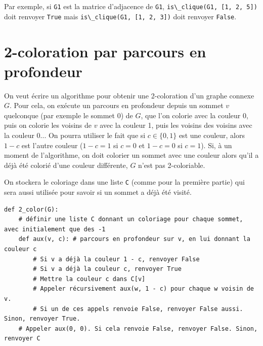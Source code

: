 
Par exemple, si \lstinline{G1} est la matrice d’adjacence de \lstinline{G1}, \lstinline{is\_clique(G1, [1, 2, 5])} doit renvoyer \lstinline{True} mais \lstinline{is\_clique(G1, [1, 2, 3])} doit renvoyer \lstinline{False}.

\section*{2-coloration par parcours en profondeur}
On veut écrire un algorithme pour obtenir une 2-coloration d’un graphe connexe $G$. Pour cela, on exécute un parcours en
profondeur depuis un sommet $v$ quelconque (par exemple le sommet 0) de $G$, que l’on colorie avec la couleur 0, puis on colorie
les voisins de $v$ avec la couleur 1, puis les voisins des voisins avec la couleur 0...
On pourra utiliser le fait que si $c\in\{0, 1\}$ est une couleur, alors $1- c$ est l’autre couleur ($1 -c = 1$ si $c = 0$ et $1 - c = 0$ si $c = 1$).
Si, à un moment de l’algorithme, on doit colorier un sommet avec une couleur alors qu’il a déjà été colorié d’une couleur différente,
$G$ n’est pas 2-coloriable.

On stockera le coloriage dans une liste \lstinline{C} (comme pour la première partie) qui sera aussi utilisée pour savoir si un sommet a déjà été
visité.

\begin{lstlisting}
def 2_color(G):
    # définir une liste C donnant un coloriage pour chaque sommet, avec initialement que des -1
    def aux(v, c): # parcours en profondeur sur v, en lui donnant la couleur c
        # Si v a déjà la couleur 1 - c, renvoyer False
        # Si v a déjà la couleur c, renvoyer True
        # Mettre la couleur c dans C[v]
        # Appeler récursivement aux(w, 1 - c) pour chaque w voisin de v.
        # Si un de ces appels renvoie False, renvoyer False aussi. Sinon, renvoyer True.
    # Appeler aux(0, 0). Si cela renvoie False, renvoyer False. Sinon, renvoyer C
\end{lstlisting}




